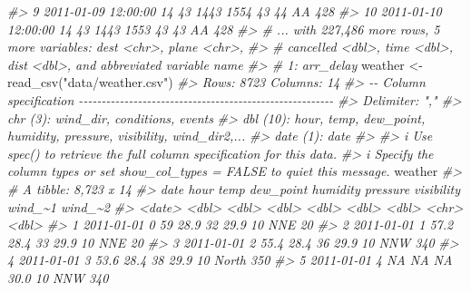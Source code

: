 \documentclass[
]{book}
\newenvironment{Shaded}{\begin{snugshade}}{\end{snugshade}}
\newcommand{\CommentTok}[1]{\textcolor[rgb]{0.56,0.35,0.01}{\textit{#1}}}
\newcommand{\FunctionTok}[1]{\textcolor[rgb]{0.00,0.00,0.00}{#1}}
\newcommand{\NormalTok}[1]{#1}
\newcommand{\OtherTok}[1]{\textcolor[rgb]{0.56,0.35,0.01}{#1}}
\newcommand{\StringTok}[1]{\textcolor[rgb]{0.31,0.60,0.02}{#1}}
\begin{document}
\begin{Shaded}
\begin{Highlighting}[]
\CommentTok{\#\textgreater{}  9 2011{-}01{-}09 12:00:00    14     43  1443  1554        43      44 AA         428}
\CommentTok{\#\textgreater{} 10 2011{-}01{-}10 12:00:00    14     43  1443  1553        43      43 AA         428}
\CommentTok{\#\textgreater{} \# ... with 227,486 more rows, 5 more variables: dest \textless{}chr\textgreater{}, plane \textless{}chr\textgreater{},}
\CommentTok{\#\textgreater{} \#   cancelled \textless{}dbl\textgreater{}, time \textless{}dbl\textgreater{}, dist \textless{}dbl\textgreater{}, and abbreviated variable name}
\CommentTok{\#\textgreater{} \#   1: arr\_delay}
\NormalTok{weather }\OtherTok{\textless{}{-}} \FunctionTok{read\_csv}\NormalTok{(}\StringTok{"data/weather.csv"}\NormalTok{)}
\CommentTok{\#\textgreater{} Rows: 8723 Columns: 14}
\CommentTok{\#\textgreater{} {-}{-} Column specification {-}{-}{-}{-}{-}{-}{-}{-}{-}{-}{-}{-}{-}{-}{-}{-}{-}{-}{-}{-}{-}{-}{-}{-}{-}{-}{-}{-}{-}{-}{-}{-}{-}{-}{-}{-}{-}{-}{-}{-}{-}{-}{-}{-}{-}{-}{-}{-}{-}{-}{-}{-}{-}{-}{-}{-}}
\CommentTok{\#\textgreater{} Delimiter: ","}
\CommentTok{\#\textgreater{} chr   (3): wind\_dir, conditions, events}
\CommentTok{\#\textgreater{} dbl  (10): hour, temp, dew\_point, humidity, pressure, visibility, wind\_dir2,...}
\CommentTok{\#\textgreater{} date  (1): date}
\CommentTok{\#\textgreater{} }
\CommentTok{\#\textgreater{} i Use \textasciigrave{}spec()\textasciigrave{} to retrieve the full column specification for this data.}
\CommentTok{\#\textgreater{} i Specify the column types or set \textasciigrave{}show\_col\_types = FALSE\textasciigrave{} to quiet this message.}
\NormalTok{weather }
\CommentTok{\#\textgreater{} \# A tibble: 8,723 x 14}
\CommentTok{\#\textgreater{}    date        hour  temp dew\_point humidity pressure visibility wind\_\textasciitilde{}1 wind\_\textasciitilde{}2}
\CommentTok{\#\textgreater{}    \textless{}date\textgreater{}     \textless{}dbl\textgreater{} \textless{}dbl\textgreater{}     \textless{}dbl\textgreater{}    \textless{}dbl\textgreater{}    \textless{}dbl\textgreater{}      \textless{}dbl\textgreater{} \textless{}chr\textgreater{}     \textless{}dbl\textgreater{}}
\CommentTok{\#\textgreater{}  1 2011{-}01{-}01     0  59        28.9       32     29.9         10 NNE          20}
\CommentTok{\#\textgreater{}  2 2011{-}01{-}01     1  57.2      28.4       33     29.9         10 NNE          20}
\CommentTok{\#\textgreater{}  3 2011{-}01{-}01     2  55.4      28.4       36     29.9         10 NNW         340}
\CommentTok{\#\textgreater{}  4 2011{-}01{-}01     3  53.6      28.4       38     29.9         10 North       350}
\CommentTok{\#\textgreater{}  5 2011{-}01{-}01     4  NA        NA         NA     30.0         10 NNW         340}

\end{Highlighting}
\end{Shaded}
\end{document}
